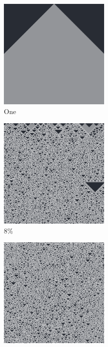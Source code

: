 \documentclass[12pt, fleqn]{report}                             %
\theoremstyle{break}                                            %
\begin{document}
      \begin{figure}[ht!]
        \centering
        \begin{subfigure}[b]{0.4\linewidth}
          \includegraphics[width=0.6\textwidth]{Images/122/a.png}
          \caption{One}
        \end{subfigure}
        \begin{subfigure}[b]{0.4\linewidth}
          \includegraphics[width=0.6\textwidth]{Images/122/b.png}
          \caption{8\%}
        \end{subfigure}
        \begin{subfigure}[b]{0.4\linewidth}
          \includegraphics[width=0.6\textwidth]{Images/122/c.png}

\end{subfigure}
\end{figure}
\end{document}
